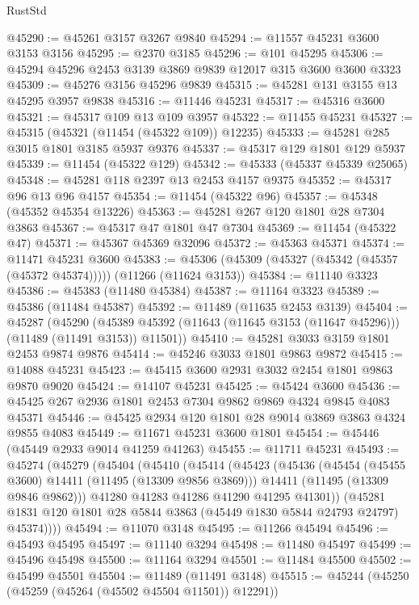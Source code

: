 \begin{lexlean}{RustStd}
\begin{coremodule}
@45290 := @45261 @3157 @3267 @9840
@45294 := @11557 @45231 @3600 @3153 @3156
@45295 := @2370 @3185
@45296 := @101 @45295
@45306 := @45294 @45296 @2453 @3139 @3869 @9839 @12017 @315 @3600 @3600 @3323
@45309 := @45276 @3156 @45296 @9839
@45315 := @45281 @131 @3155 @13 @45295 @3957 @9838
@45316 := @11446 @45231
@45317 := @45316 @3600
@45321 := @45317 @109 @13 @109 @3957
@45322 := @11455 @45231
@45327 := @45315 (@45321 (@11454 (@45322 @109)) @12235)
@45333 := @45281 @285 @3015 @1801 @3185 @5937 @9376
@45337 := @45317 @129 @1801 @129 @5937
@45339 := @11454 (@45322 @129)
@45342 := @45333 (@45337 @45339 @25065)
@45348 := @45281 @118 @2397 @13 @2453 @4157 @9375
@45352 := @45317 @96 @13 @96 @4157
@45354 := @11454 (@45322 @96)
@45357 := @45348 (@45352 @45354 @13226)
@45363 := @45281 @267 @120 @1801 @28 @7304 @3863
@45367 := @45317 @47 @1801 @47 @7304
@45369 := @11454 (@45322 @47)
@45371 := @45367 @45369 @32096
@45372 := @45363 @45371
@45374 := @11471 @45231 @3600
@45383 := @45306 (@45309 (@45327 (@45342 (@45357 (@45372 @45374))))) (@11266 (@11624 @3153))
@45384 := @11140 @3323
@45386 := @45383 (@11480 @45384)
@45387 := @11164 @3323
@45389 := @45386 (@11484 @45387)
@45392 := @11489 (@11635 @2453 @3139)
@45404 := @45287
    (@45290 (@45389 @45392 (@11643 (@11645 @3153 (@11647 @45296))) (@11489 (@11491 @3153)) @11501))
@45410 := @45281 @3033 @3159 @1801 @2453 @9874 @9876
@45414 := @45246 @3033 @1801 @9863 @9872
@45415 := @14088 @45231
@45423 := @45415 @3600 @2931 @3032 @2454 @1801 @9863 @9870 @9020
@45424 := @14107 @45231
@45425 := @45424 @3600
@45436 := @45425 @267 @2936 @1801 @2453 @7304 @9862 @9869 @4324 @9845 @4083 @45371
@45446 := @45425 @2934 @120 @1801 @28 @9014 @3869 @3863 @4324 @9855 @4083
@45449 := @11671 @45231 @3600 @1801
@45454 := @45446 (@45449 @2933 @9014 @41259 @41263)
@45455 := @11711 @45231
@45493 := @45274
    (@45279
      (@45404
        (@45410
          (@45414
            (@45423
              (@45436
                (@45454 (@45455 @3600) @14411 (@11495 (@13309 @9856 @3869)))
                @14411
                (@11495 (@13309 @9846 @9862)))
              @41280
              @41283
              @41286
              @41290
              @41295
              @41301))
          (@45281 @1831 @120 @1801 @28 @5844 @3863 (@45449 @1830 @5844 @24793 @24797) @45374))))
@45494 := @11070 @3148
@45495 := @11266 @45494
@45496 := @45493 @45495
@45497 := @11140 @3294
@45498 := @11480 @45497
@45499 := @45496 @45498
@45500 := @11164 @3294
@45501 := @11484 @45500
@45502 := @45499 @45501
@45504 := @11489 (@11491 @3148)
@45515 := @45244
    (@45250 (@45259 (@45264 (@45502 @45504 @11501)) @12291))

\end{coremodule}
\end{lexlean}
